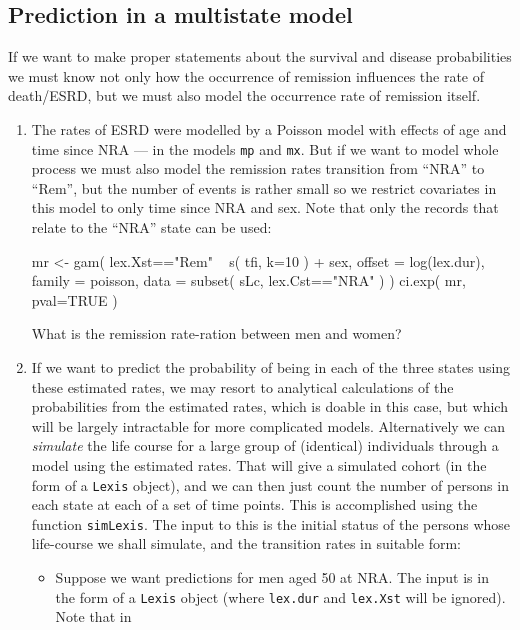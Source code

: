 \subsection{Prediction in a multistate model}
If we want to make proper statements about the survival and disease
probabilities we must know not only how the occurrence of remission
influences the rate of death/ESRD, but we must also model the
occurrence rate of remission itself.
\begin{enumerate}[resume] 
\item The rates of ESRD were modelled by a Poisson model with
  effects of age and time since NRA --- in the models \texttt{mp}
  and \texttt{mx}.  But if we want to model whole process we must
  also model the remission rates transition from ``NRA'' to
  ``Rem'', but the number of events is rather small so we restrict
  covariates in this model to only time since NRA and sex. Note
  that only the records that relate to the ``NRA'' state can be
  used:
\begin{Schunk}
\begin{Sinput}
 mr <- gam( lex.Xst=="Rem" ~ s( tfi, k=10 ) + sex,
            offset = log(lex.dur),
            family = poisson,
              data = subset( sLc, lex.Cst=="NRA" ) )
 ci.exp( mr, pval=TRUE )
\end{Sinput}
\end{Schunk}
What is the remission rate-ration between men and women?
\item If we want to predict the probability of being in each of the
  three states using these estimated rates, we may resort to
  analytical calculations of the probabilities from the estimated
  rates, which is doable in this case, but which will be largely
  intractable for more complicated models. 
  Alternatively we can \emph{simulate} the life course for a large
  group of (identical) individuals through a model using the estimated
  rates. That will give a simulated cohort (in the form of a
  \texttt{Lexis} object), and we can then just count the number of
  persons in each state at each of a set of time points.
  This is accomplished using the function \texttt{simLexis}. The input
  to this is the initial status of the persons whose life-course we
  shall simulate, and the transition rates in suitable form:
\begin{itemize}
\item Suppose we want predictions for men aged 50 at
  NRA. The input is in the form of a \texttt{Lexis} object (where
  \texttt{lex.dur} and \texttt{lex.Xst} will be ignored). Note that in

\end{itemize}
\end{enumerate}

